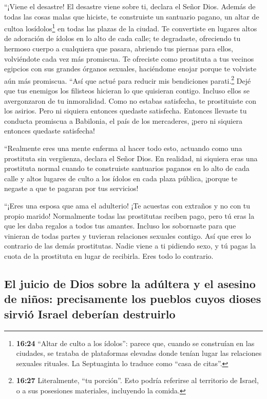  ``¡Viene el desastre! El desastre viene sobre ti,
declara el Señor Dios. Además de todas las cosas malas que hiciste,
 te construiste un santuario pagano, un altar de cultoa
losídolos\footnote{\textbf{16:24} ``Altar de culto a los ídolos'':
  parece que, cuando se construían en las ciudades, se trataba de
  plataformas elevadas donde tenían lugar las relaciones sexuales
  rituales. La Septuaginta lo traduce como ``casa de citas''.} en todas
las plazas de la ciudad.  Te convertiste en lugares altos
de adoración de ídolos en lo alto de cada calle; te degradaste,
ofreciendo tu hermoso cuerpo a cualquiera que pasara, abriendo tus
piernas para ellos, volviéndote cada vez más promiscua. 
Te ofreciste como prostituta a tus vecinos egipcios con sus grandes
órganos sexuales, haciéndome enojar porque te volviste aún más
promiscua.  ``Así que actué para reducir mis bendiciones
parati.\footnote{\textbf{16:27} Literalmente, ``tu porción''. Esto
  podría referirse al territorio de Israel, o a sus posesiones
  materiales, incluyendo la comida.} Dejé que tus enemigos los filisteos
hicieran lo que quisieran contigo. Incluso ellos se avergonzaron de tu
inmoralidad.  Como no estabas satisfecha, te prostituiste
con los asirios. Pero ni siquiera entonces quedaste satisfecha.
 Entonces llevaste tu conducta promiscua a Babilonia, el
país de los mercaderes, ¡pero ni siquiera entonces quedaste satisfecha!

 ``Realmente eres una mente enferma al hacer todo esto,
actuando como una prostituta sin vergüenza, declara el Señor Dios.
 En realidad, ni siquiera eras una prostituta normal
cuando te construiste santuarios paganos en lo alto de cada calle y
altos lugares de culto a los ídolos en cada plaza pública, ¡porque te
negaste a que te pagaran por tus servicios!

 ``¡Eres una esposa que ama el adulterio! ¡Te acuestas
con extraños y no con tu propio marido!  Normalmente
todas las prostitutas reciben pago, pero tú eras la que les daba regalos
a todos tus amantes. Incluso los sobornaste para que vinieran de todas
partes y tuvieran relaciones sexuales contigo.  Así que
eres lo contrario de las demás prostitutas. Nadie viene a ti pidiendo
sexo, y tú pagas la cuota de la prostituta en lugar de recibirla. Eres
todo lo contrario.

\hypertarget{el-juicio-de-dios-sobre-la-aduxfaltera-y-el-asesino-de-niuxf1os-precisamente-los-pueblos-cuyos-dioses-sirviuxf3-israel-deberuxedan-destruirlo}{%
\subsection{El juicio de Dios sobre la adúltera y el asesino de niños:
precisamente los pueblos cuyos dioses sirvió Israel deberían
destruirlo}\label{el-juicio-de-dios-sobre-la-aduxfaltera-y-el-asesino-de-niuxf1os-precisamente-los-pueblos-cuyos-dioses-sirviuxf3-israel-deberuxedan-destruirlo}}

